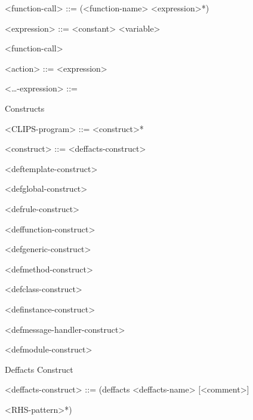 \documentclass[letterpaper,10pt,english]{sphinxmanual}
\begin{document}
\textless{}function-call\textgreater{} ::= (\textless{}function-name\textgreater{} \textless{}expression\textgreater{}*)

\textless{}expression\textgreater{} ::= \textless{}constant\textgreater{} \textbar{} \textless{}variable\textgreater{} \textbar{}

\textless{}function-call\textgreater{}

\textless{}action\textgreater{} ::= \textless{}expression\textgreater{}

\textless{}…-expression\textgreater{} ::= 





Constructs

\textless{}CLIPS-program\textgreater{} ::= \textless{}construct\textgreater{}*

\textless{}construct\textgreater{} ::= \textless{}deffacts-construct\textgreater{} \textbar{}

\textless{}deftemplate-construct\textgreater{} \textbar{}

\textless{}defglobal-construct\textgreater{} \textbar{}

\textless{}defrule-construct\textgreater{} \textbar{}

\textless{}deffunction-construct\textgreater{} \textbar{}

\textless{}defgeneric-construct\textgreater{} \textbar{}

\textless{}defmethod-construct\textgreater{} \textbar{}

\textless{}defclass-construct\textgreater{} \textbar{}

\textless{}definstance-construct\textgreater{} \textbar{}

\textless{}defmessage-handler-construct\textgreater{} \textbar{}

\textless{}defmodule-construct\textgreater{}

Deffacts Construct

\begin{DUlineblock}{0em}
\item[] \textless{}deffacts-construct\textgreater{} ::= (deffacts \textless{}deffacts-name\textgreater{} {[}\textless{}comment\textgreater{}{]}
\item[] \textless{}RHS-pattern\textgreater{}*)
\end{DUlineblock}
\end{document}
